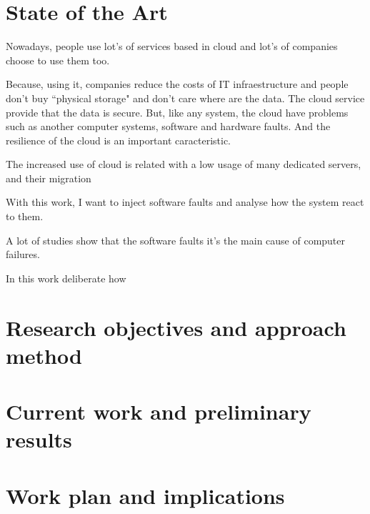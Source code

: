 \newpage
\section{State of the Art}

Nowadays, people use lot's of services based in cloud and lot's of companies choose to use them too.

Because, using it, companies reduce the costs of IT infraestructure and people don't buy ``physical storage" and don't care where are the data. The cloud service provide that the data is secure.
But, like any system, the cloud have problems such as another computer systems, software and hardware faults. And the resilience of the cloud is an important caracteristic.

The increased use of cloud is related with a low usage of many dedicated servers, and their migration 



With this work, I want to inject software faults and analyse how the system react to them.

A lot of studies show that the software faults it's the main cause of computer failures.

In this work
deliberate how 

\cite{duraes2006emulation}
\cite{wolter2012resilience}
\cite{avizzienisbasic}



\newpage
\section{Research objectives and approach method}

\newpage
\section{Current work and preliminary results}

\newpage
\section{Work plan and implications}